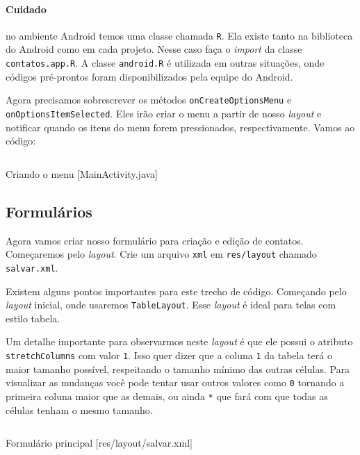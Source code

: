 \paragraph{Cuidado \label{par:r}}

no ambiente Android temos uma classe chamada \texttt{R}. Ela existe
tanto na biblioteca do Android como em cada projeto. Nesse caso faça o
\emph{import} da classe \texttt{contatos.app.R}. A classe
\texttt{android.R} é utilizada em outras situações, onde códigos
pré-prontos foram disponibilizados pela equipe do Android.

Agora precisamos sobrescrever os métodos \texttt{onCreateOptionsMenu} e
\texttt{onOptionsItemSelected}. Eles irão criar o menu a partir de nosso
\emph{layout} e notificar quando os itens do menu forem pressionados,
respectivamente. Vamos ao código:

\begin{listing}[H]
  \inputminted[linenos=true,frame=bottomline,tabsize=3]{ java }{ source/MainActivity-2.java }
  \caption{Criando o menu [MainActivity.java]}
\end{listing}

\subsection{Formulários}

Agora vamos criar nosso formulário para criação e edição de contatos.
Começaremos pelo \emph{layout}. Crie um arquivo \texttt{xml} em
\texttt{res/layout} chamado \texttt{salvar.xml}.

Existem alguns pontos importantes para este trecho de código. Começando
pelo \emph{layout} inicial, onde usaremos \texttt{TableLayout}. Esse
\emph{layout} é ideal para telas com estilo tabela.

Um detalhe importante para observarmos neste \emph{layout} é que ele
possui o atributo \texttt{stretchColumns} com valor \texttt{1}. Isso
quer dizer que a coluna \texttt{1} da tabela terá o maior tamanho
possível, respeitando o tamanho mínimo das outras células. Para
visualizar as mudanças você pode tentar usar outros valores como
\texttt{0} tornando a primeira coluna maior que as demais, ou ainda
\texttt{*} que fará com que todas as células tenham o mesmo tamanho.

\begin{listing}[H]
  \inputminted[linenos=true,frame=bottomline,tabsize=3]{ xml }{ source/salvar-1.xml }
  \caption{Formulário principal [res/layout/salvar.xml]}
\end{listing}

